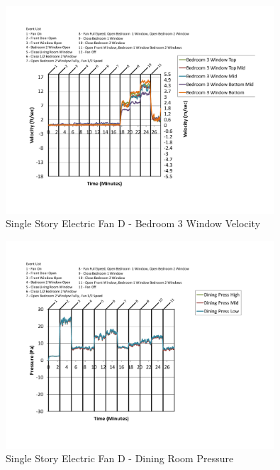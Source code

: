 \documentclass{article}
\begin{document}
\begin{appendices}
	\begin{figure}[H]
		\centering
		\includegraphics[height=3.05in,trim=0.67in 1.1in 0.67in 0.8in,clip=true]{0_Images/Results_Charts/ColdFlow/Single_Story/Electric/D/Bedroom_3_Window_Velocity.pdf}
		\caption{Single Story Electric Fan D - Bedroom 3 Window Velocity}
	\end{figure}
 

	\begin{figure}[H]
		\centering
		\includegraphics[height=3.05in,trim=0.67in 1.1in 0.67in 0.8in,clip=true]{0_Images/Results_Charts/ColdFlow/Single_Story/Electric/D/Dining_Room_Pressure.pdf}
		\caption{Single Story Electric Fan D - Dining Room Pressure}
	\end{figure}
 
	\clearpage


\end{appendices}
\end{document}
